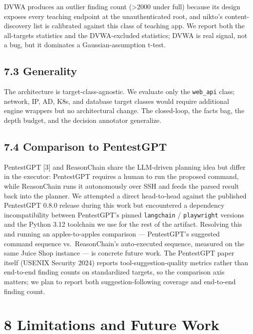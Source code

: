 \documentclass[
]{article}
\begin{document}
DVWA produces an outlier finding count (\textgreater2000 under full)
because its design exposes every teaching endpoint at the
unauthenticated root, and nikto's content-discovery list is calibrated
against this class of teaching app. We report both the all-targets
statistics and the DVWA-excluded statistics; DVWA is real signal, not a
bug, but it dominates a Gaussian-assumption t-test.

\subsection{7.3 Generality}\label{generality}

The architecture is target-class-agnostic. We evaluate only the
\texttt{web\_api} class; network, IP, AD, K8s, and database target
classes would require additional engine wrappers but no architectural
change. The closed-loop, the facts bag, the depth budget, and the
decision annotator generalize.

\subsection{7.4 Comparison to
PentestGPT}\label{comparison-to-pentestgpt}

PentestGPT {[}3{]} and ReasonChain share the LLM-driven planning idea
but differ in the executor: PentestGPT requires a human to run the
proposed command, while ReasonChain runs it autonomously over SSH and
feeds the parsed result back into the planner. We attempted a direct
head-to-head against the published PentestGPT 0.8.0 release during this
work but encountered a dependency incompatibility between PentestGPT's
pinned \texttt{langchain} / \texttt{playwright} versions and the Python
3.12 toolchain we use for the rest of the artifact. Resolving this and
running an apples-to-apples comparison --- PentestGPT's suggested
command sequence vs.~ReasonChain's auto-executed sequence, measured on
the same Juice Shop instance --- is concrete future work. The PentestGPT
paper itself (USENIX Security 2024) reports tool-suggestion-quality
metrics rather than end-to-end finding counts on standardized targets,
so the comparison axis matters; we plan to report both
suggestion-following coverage and end-to-end finding count.

\section{8 Limitations and Future
Work}\label{limitations-and-future-work}
\end{document}
